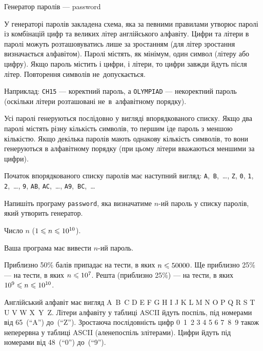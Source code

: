\begin{problemAllDefault}{Генератор паролів --- password}

У генераторі паролів закладена схема, яка за певними правилами утворює паролі із комбінацій цифр та великих літер англійського алфавіту. Цифри та літери в паролі можуть розташовуватись лише за зростанням (для літер зростання визначається алфавітом). Паролі містять, як мінімум, один символ (літеру або цифру). Якщо пароль містить і цифри, і літери, то цифри завжди йдуть після літер. Повторення символів не~допускається.

Наприклад: \texttt{CH15} --- коректний пароль, а \texttt{OLYMPIAD} --- некоректний пароль (оскільки літери розташовані не~в~алфавітному порядку).

Усі паролі генеруються послідовно у вигляді впорядкованого списку. Якщо два паролі містять різну кількість символів, то першим іде пароль з меншою кількістю. Якщо декілька паролів мають однакову кількість символів, то вони генеруються в алфавітному порядку (при цьому літери вважаються меншими за цифри).

Початок впорядкованого списку паролів має наступний вигляд: \texttt{A},~\texttt{B},~\dots, \texttt{Z}, \texttt{0}, \texttt{1}, \texttt{2},~\dots, \texttt{9}, \texttt{AB}, \texttt{AC},~\dots, \texttt{A9},~\texttt{BC},~\dots 

\Task Напишіть програму \texttt{password}, яка визначатиме $n$-ий пароль у списку паролів, який утворить генератор.

\InputFile Число $n$ ($1\leqslant n\leqslant10^{10}$).

\OutputFile Ваша програма має вивести $n$-ий пароль.

\Examples
\begin{exampleSimple}{2em}{2em}%
%
%
\end{exampleSimple}

\Scoring Приблизно 50\% балів припадає на тести, в яких $n\leqslant50000$. Ще приблизно 25\% --- на тести, в яких $n\leqslant10^7$. Решта (приблизно 25\%) --- на тести, в яких $10^9 \leqslant n \leqslant 10^{10}$.


\Note Англійський алфавіт має вигляд A~B~C D E F G H I J K L M N O P Q R S T U V W X~Y~Z. Літери алфавіту у таблиці ASCII йдуть поспіль, під номерами від 65~(``A'') до~(``Z''). Зростаюча послідовність цифр 0~1~2 3 4 5 6 7~8~9 також неперервна у таблиці ASCII (але\nolinebreak[3] не\nolinebreak[2] поспіль з\nolinebreak[3] літерами). Цифри йдуть під номерами від 48~(``0'') до~(``9'').


\end{problemAllDefault}
